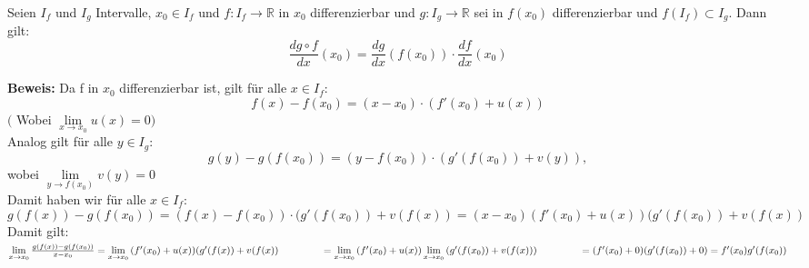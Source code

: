 \begin{Satz}[Kettenregel]{
	Seien $I_f$ und $I_g$ Intervalle, $x_0 \in I_f$ und 
	$f : I_f \rightarrow \mathbb{R}$ in $x_0$ differenzierbar und 
	$g: I_g \rightarrow \mathbb{R}$ sei in $f(x_0)$ differenzierbar und 
	$f(I_f) \subset I_g$. Dann gilt:
	\begin{equation*}
	\frac{d g \circ f}{dx}(x_0) = \frac{dg}{dx}(f(x_0)) \cdot \frac{df}{dx}(x_0)
	\end{equation*}
	
	\textbf{Beweis:}
	\noindent\hspace*{5mm} Da f in $x_0$ differenzierbar ist, gilt für alle 
	$x \in I_f$: \\
	\begin{equation*}
		f(x) -f(x_0) = (x-x_0) \cdot(f'(x_0) + u(x))
	\end{equation*}
	\noindent\hspace*{5mm}$($ Wobei $\lim\limits_{x \rightarrow x_0}{u(x) = 0})$ \\
	\noindent\hspace*{5mm}Analog gilt für alle $y \in I_g$: \\
	\begin{equation*}
		g(y) -g(f(x_0)) = (y-f(x_0)) \cdot (g'(f(x_0)) + v(y)),
	\end{equation*}		
	\noindent\hspace*{5mm}wobei $\lim\limits_{y \rightarrow f(x_0)}{v(y) = 0}$ \\
	\noindent\hspace*{5mm}Damit haben wir für alle $x \in I_f$: \\
	\begin{equation*}
	g(f(x)) - g(f(x_0)) = (f(x)-f(x_0)) \cdot (g'(f(x_0)) + v(f(x))
	= (x-x_0)(f'(x_0) + u(x)) (g'(f(x_0)) + v(f(x))
	\end{equation*}
	\noindent\hspace*{5mm}Damit gilt: \\
	\noindent\hspace*{15mm}$\lim\limits_{x \rightarrow x_0}
	{\frac{g(f(x))-g(f(x_0))}{x-x_0} } 
	= \lim\limits_{x \rightarrow x_0}{(f'(x_0) + u(x)) (g'(f(x)) + v(f(x))}
	\\ \noindent\hspace*{15mm}
	= \lim\limits_{x \rightarrow x_0}{(f'(x_0) + u(x))} 
	\lim\limits_{x \rightarrow x_0}{(g'(f(x_0)) + v(f(x)))}
	 \\ \noindent\hspace*{15mm}
	= (f'(x_0) + 0) (g'(f(x_0)) + 0)
	= f'(x_0) g'(f(x_0))$
}\end{Satz}

